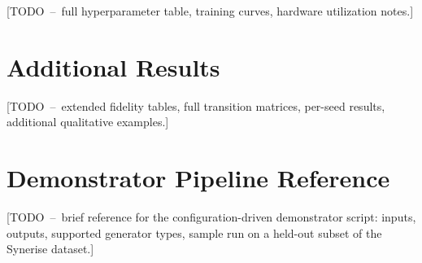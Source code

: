 \documentclass[sigconf,nonacm]{acmart}
\begin{document}
[TODO~--~full hyperparameter table, training curves, hardware utilization
notes.]

\section{Additional Results}
[TODO~--~extended fidelity tables, full transition matrices, per-seed
results, additional qualitative examples.]

\section{Demonstrator Pipeline Reference}
[TODO~--~brief reference for the configuration-driven demonstrator script:
inputs, outputs, supported generator types, sample run on a held-out
subset of the Synerise dataset.]
\end{document}
